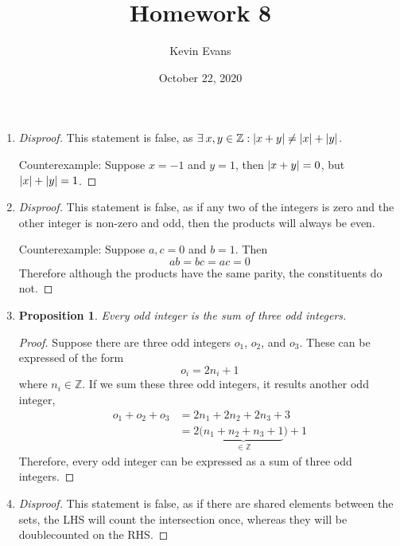 \documentclass{homework}
\title{Homework 8}
\author{Kevin Evans}
\date{October 22, 2020}
\newtheorem*{prop}{Proposition}
\begin{document}
	\maketitle
	

	\begin{enumerate}
		\item \begin{proof}[Disproof]
			This statement is false, as $\exists \: x, y \in \mathbb{Z} : \abs{x+y} \ne \abs{x} + \abs{y}$.
			
			Counterexample: Suppose $x = -1$ and $y = 1$, then $\abs{x+y} = 0$, but $\abs{x} + \abs{y} = 1$.
		\end{proof} 
	
		\item  \begin{proof}[Disproof]
			This statement is false, as if any two of the integers is zero and the other integer is non-zero and odd, then the products will always be even. 
			
			Counterexample: Suppose $a, c = 0$ and $b = 1$. Then \[ ab = bc = ac = 0 \]
			Therefore although the products have the same parity, the constituents do not.
		\end{proof} 
	
		\item \begin{minipage}[t]{\linewidth}
			\begin{prop}
				Every odd integer is the sum of three odd integers.
			\end{prop}
			\begin{proof}
				Suppose there are three odd integers $o_1$, $o_2$, and $o_3$. These can be expressed of the form $$o_i = 2n_i + 1$$where $n_i \in \mathbb{Z}$. If we sum these three odd integers, it results another odd integer, \begin{align*}
					o_1 + o_2 + o_3 & = 2n_1 + 2n_2 + 2n_3 + 3 \\
						& = 2 \bigg( \underbrace{n_1 + n_2 + n_3 + 1}_{\in \mathbb{Z}} \bigg) + 1
				\end{align*}
				Therefore, every odd integer can be expressed as a sum of three odd integers. 
			\end{proof}
		\end{minipage}
	
		\item  \begin{proof}[Disproof]
			This statement is false, as if there are shared elements between the sets, the LHS will count the intersection once, whereas they will be doublecounted on the RHS.
			

\end{proof}
\end{enumerate}
\end{document}
